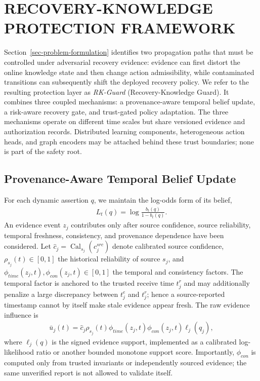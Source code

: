 \section{RECOVERY-KNOWLEDGE PROTECTION FRAMEWORK}
\label{sec-rkguard}
Section~\ref{sec-problem-formulation} identifies two propagation paths that must be controlled under adversarial recovery evidence: evidence can first distort the online knowledge state and then change action admissibility, while contaminated transitions can subsequently shift the deployed recovery policy. We refer to the resulting protection layer as \emph{RK-Guard} (Recovery-Knowledge Guard). It combines three coupled mechanisms: a provenance-aware temporal belief update, a risk-aware recovery gate, and trust-gated policy adaptation. The three mechanisms operate on different time scales but share versioned evidence and authorization records. Distributed learning components, heterogeneous action heads, and graph encoders may be attached behind these trust boundaries; none is part of the safety root.

\subsection{Provenance-Aware Temporal Belief Update}
\label{subsec-patb}
For each dynamic assertion $q$, we maintain the log-odds form of its belief,
\begin{align}
\label{eq-patb-logodds}
L_t(q)=\log\frac{b_t(q)}{1-b_t(q)}.
\end{align}
An evidence event $z_j$ contributes only after source confidence, source reliability, temporal freshness, consistency, and provenance dependence have been considered. Let $\widehat c_j=\operatorname{Cal}_{s_j}(c_j^{src})$ denote calibrated source confidence, $\rho_{s_j}(t)\in[0,1]$ the historical reliability of source $s_j$, and $\phi_{time}(z_j,t),\phi_{con}(z_j,t)\in[0,1]$ the temporal and consistency factors. The temporal factor is anchored to the trusted receive time $t_j^r$ and may additionally penalize a large discrepancy between $t_j^e$ and $t_j^r$; hence a source-reported timestamp cannot by itself make stale evidence appear fresh. The raw evidence influence is
\begin{align}
\label{eq-patb-raw-influence}
\bar u_j(t)=\widehat c_j\rho_{s_j}(t)\phi_{time}(z_j,t)\phi_{con}(z_j,t)\ell_j(q_j),
\end{align}
where $\ell_j(q)$ is the signed evidence support, implemented as a calibrated log-likelihood ratio or another bounded monotone support score. Importantly, $\phi_{con}$ is computed only from trusted invariants or independently sourced evidence; the same unverified report is not allowed to validate itself.

